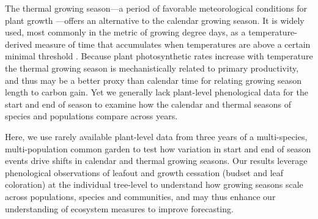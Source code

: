 \documentclass{article}[12pt]
\begin{document}
The thermal growing season---a period of favorable meteorological conditions for plant growth \citep{Korner2023}---offers an alternative to the calendar growing season. It is widely used, most commonly in the metric of growing degree days, as a temperature-derived measure of time that accumulates when temperatures are above a certain minimal threshold \citep{CHUINE2000337,YANG199561}. Because plant photosynthetic rates increase with temperature \citep{Farquhar:1980vm} the thermal growing season is mechanistically related to primary productivity, and thus may be a better proxy than calendar time for relating growing season length to carbon gain. Yet we generally lack plant-level phenological data for the start and end of season to examine how the calendar and thermal seasons of species and populations compare across years. 



Here, we use rarely available plant-level data from three years of a multi-species, multi-population common garden to test how variation in start and end of season events drive shifts in calendar and thermal growing seasons. Our results leverage phenological observations of leafout and growth cessation (budset and leaf coloration) at the individual tree-level to understand how growing seasons scale across populations, species and communities, and may thus enhance our understanding of ecosystem measures to improve forecasting.  %
\end{document}
